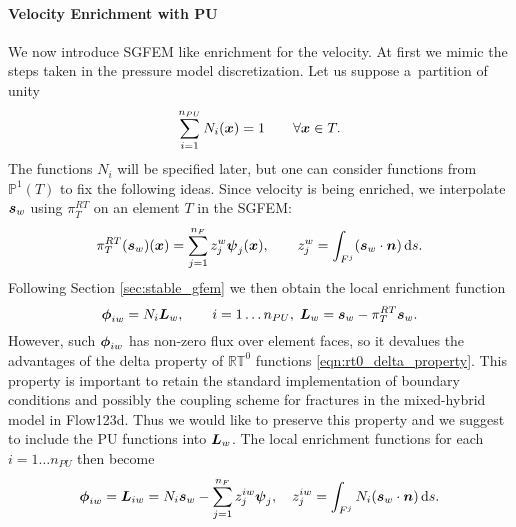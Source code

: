\paragraph{Velocity Enrichment with PU}
We now introduce SGFEM like enrichment for the velocity.
At first we mimic the steps taken in the pressure model discretization.
Let us suppose a~partition of unity
\begin{equation}
    \sum\limits_{i=1}^{n_{PU}} N_i(\mathbf{\boldsymbol{x}}) = 1 \qquad \forall \mathbf{\boldsymbol{x}}\in T.
\end{equation}
The functions $N_i$ will be specified later, but one can consider functions from $\mathbb P^1(T)$ to fix the following ideas.
Since velocity is being enriched, we interpolate $\mathbf{\boldsymbol{s}}_w$ using $\pi^{RT}_T$ on an element $T$ in the SGFEM:
\begin{equation}
    \pi^{RT}_T(\mathbf{\boldsymbol{s}}_w)(\mathbf{\boldsymbol{x}}) = \sum \limits_{j=1}^{n_F} z^w_j \mathbf{\boldsymbol{\psi}}_j(\mathbf{\boldsymbol{x}}),
    \qquad z^w_j=\int_{F^j} (\mathbf{\boldsymbol{s}}_w\cdot \mathbf{\boldsymbol{n}})\,{\rm d} s \label{eqn:sgfem_interpolant_vel}.
\end{equation}
Following Section \ref{sec:stable_gfem} we then obtain the local enrichment function
\begin{equation}
    \mathbf{\boldsymbol{\phi}}_{iw}=N_i\mathbf{\boldsymbol{L}}_{w}, \qquad i=1\ldots n_{PU},\;\mathbf{\boldsymbol{L}}_{w}=\mathbf{\boldsymbol{s}}_w - \pi^{RT}_T\mathbf{\boldsymbol{s}}_w.
\end{equation}
However, such $\mathbf{\boldsymbol{\phi}}_{iw}$ has non-zero flux over element faces, so it devalues
the advantages of the delta property of $\mathbb{RT}^0$ functions \eqref{eqn:rt0_delta_property}.
This property is important to retain the standard implementation of boundary conditions
and possibly the coupling scheme for fractures in the mixed-hybrid model in Flow123d.
Thus we would like to preserve this property and we suggest to include the PU functions into $\mathbf{\boldsymbol{L}}_w$.
The local enrichment functions for each $i=1\ldots n_{PU}$ then become
\begin{equation}
    \mathbf{\boldsymbol{\phi}}_{iw} = \mathbf{\boldsymbol{L}}_{iw} = N_i\mathbf{\boldsymbol{s}}_w - \sum \limits_{j=1}^{n_F} z^{iw}_j \mathbf{\boldsymbol{\psi}}_j,
    \quad z^{iw}_j=\int_{F^j} N_i (\mathbf{\boldsymbol{s}}_w\cdot \mathbf{\boldsymbol{n}})\,{\rm d} s \label{eqn:local_enr_vel_PU}.
\end{equation}
